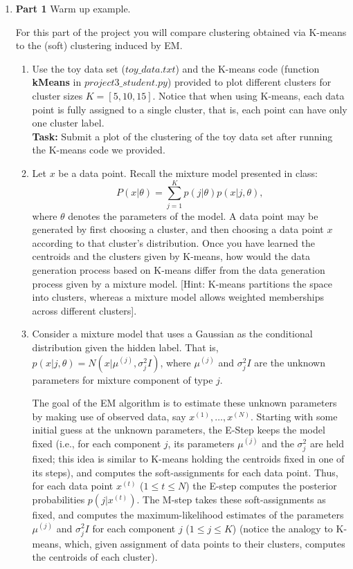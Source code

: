 \begin{enumerate}

\item {\bf Part 1} Warm up example.

For this part of the project you will compare clustering obtained via K-means to the (soft) clustering induced by EM.

\begin{enumerate}
  \item Use the toy data set (\texttt{$toy\_data.txt$}) and the K-means code (function \textbf{kMeans} in \texttt{$project3\_student.py$}) provided to plot different clusters for cluster sizes $K = [5, 10, 15]$. Notice that when using K-means, each data point is fully assigned to a single cluster, that is, each point can have only one cluster label.\\
  \textbf{Task:} Submit a plot of the clustering of the toy data set after running the K-means code we provided.
  
  \item Let $x$ be a data point. Recall the mixture model presented in class: $$P(x | \theta) = \sum^{K}_{j=1} p(j| \theta)p(x | j, \theta),$$ where $\theta$ denotes the parameters of the model. A data point may be generated by first choosing a cluster, and then choosing a data point $x$ according to that cluster's distribution. Once you have learned the centroids and the clusters given by K-means, how would the data generation process based on K-means differ from the data generation process given by a mixture model. [Hint: K-means partitions the space into clusters, whereas a mixture model allows weighted memberships across different clusters].
  \item Consider a mixture model that uses a Gaussian as the conditional distribution given the hidden label. That is, $p(x | j, \theta) = N(x | \mu^{(j)}, \sigma^2_{j} I)$, where $\mu^{(j)}$ and $\sigma^2_jI$ are the unknown parameters for mixture component of type $j$.

    The goal of the EM algorithm is to estimate these unknown parameters by making use of observed data, say $x^{(1)},\ldots, x^{(N)}$. Starting with some initial guess at the unknown parameters, the E-Step keeps the model fixed (i.e., for each component $j$, its parameters $\mu^{(j)}$ and the $\sigma^2_{j}$ are held fixed; this idea is similar to K-means holding the centroids fixed in one of its steps), and computes the soft-assignments for each data point. Thus, for each data point $x^{(t)}$ ($1 \le t \le N$) the E-step computes the posterior probabilities $p(j | x^{(t)})$. The M-step takes these soft-assignments as fixed, and computes the maximum-likelihood estimates of the parameters $\mu^{(j)}$ and $\sigma_j^2I$ for each component $j$ ($1 \le j \le K$) (notice the analogy to K-means, which, given assignment of data points to their clusters, computes the centroids of each cluster).


\end{enumerate}
\end{enumerate}

